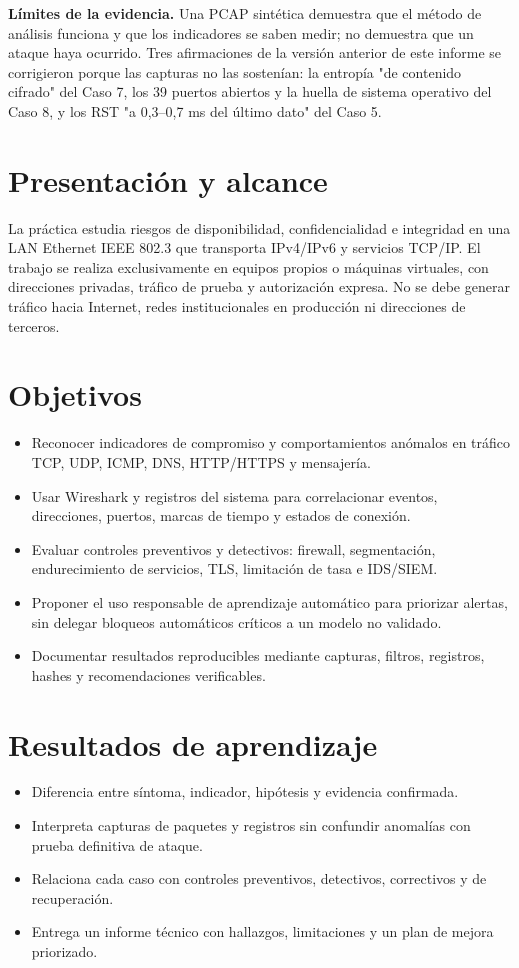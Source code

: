 \textbf{Límites de la evidencia.} Una PCAP sintética demuestra que el método de análisis funciona y que los indicadores se saben medir; no demuestra que un ataque haya ocurrido. Tres afirmaciones de la versión anterior de este informe se corrigieron porque las capturas no las sostenían: la entropía "de contenido cifrado" del Caso 7, los 39 puertos abiertos y la huella de sistema operativo del Caso 8, y los RST "a 0,3--0,7 ms del último dato" del Caso 5.

\section{Presentaci\'on y alcance}
La práctica estudia riesgos de disponibilidad, confidencialidad e integridad en una LAN Ethernet IEEE 802.3 que transporta IPv4/IPv6 y servicios TCP/IP. El trabajo se realiza exclusivamente en equipos propios o máquinas virtuales, con direcciones privadas, tráfico de prueba y autorización expresa. No se debe generar tráfico hacia Internet, redes institucionales en producción ni direcciones de terceros.

\section{Objetivos}
\begin{itemize}
  \item Reconocer indicadores de compromiso y comportamientos anómalos en tráfico TCP, UDP, ICMP, DNS, HTTP/HTTPS y mensajería.
  \item Usar Wireshark y registros del sistema para correlacionar eventos, direcciones, puertos, marcas de tiempo y estados de conexión.
  \item Evaluar controles preventivos y detectivos: firewall, segmentación, endurecimiento de servicios, TLS, limitación de tasa e IDS/SIEM.
  \item Proponer el uso responsable de aprendizaje automático para priorizar alertas, sin delegar bloqueos automáticos críticos a un modelo no validado.
  \item Documentar resultados reproducibles mediante capturas, filtros, registros, hashes y recomendaciones verificables.
\end{itemize}

\section{Resultados de aprendizaje}
\begin{itemize}
  \item Diferencia entre síntoma, indicador, hipótesis y evidencia confirmada.
  \item Interpreta capturas de paquetes y registros sin confundir anomalías con prueba definitiva de ataque.
  \item Relaciona cada caso con controles preventivos, detectivos, correctivos y de recuperación.
  \item Entrega un informe técnico con hallazgos, limitaciones y un plan de mejora priorizado.
\end{itemize}

